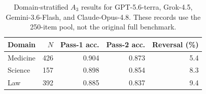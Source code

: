 \begin{table}[htbp]
\caption{Domain-stratified $A_3$ results for GPT-5.6-terra, Grok-4.5, Gemini-3.6-Flash, and Claude-Opus-4.8. These records use the 250-item pool, not the original full benchmark.}
\label{tab:additional_domains}
\centering
\small
\setlength{\tabcolsep}{3.5pt}
\begin{tabular}{lrrrr}
\toprule
Domain & $N$ & Pass-1 acc. & Pass-2 acc. & Reversal (\%) \\
\midrule
Medicine & 426 & 0.904 & 0.873 & 5.4 \\
Science & 157 & 0.898 & 0.854 & 8.3 \\
Law & 392 & 0.885 & 0.837 & 9.4 \\
\bottomrule
\end{tabular}
\end{table}
